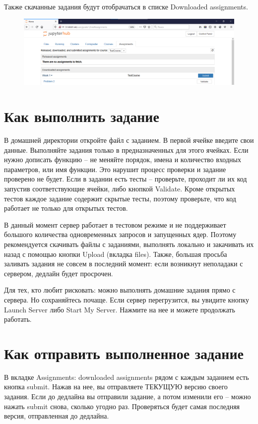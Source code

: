 \documentclass[a4paper,12pt]{article}
\begin{document}
Также скачанные задания будут отобрачаться в списке Downloaded assignments.

\begin{figure}[h]
\includegraphics[width=\textwidth]{fetched}
\end{figure}

\section{Как выполнить задание}
В домашней директории откройте файл с заданием. В первой ячейке введите свои данные. Выполняйте задания только в предназначенных для этого ячейках. Если нужно дописать функцию -- не меняйте порядок, имена и количество входных параметров, или имя функции. Это нарушит процесс проверки и задание проверено не будет. Если в задании есть тесты -- проверьте, проходит ли их код запустив соответствующие ячейки, либо кнопкой Validate. Кроме открытых тестов каждое задание содержит скрытые тесты, поэтому проверьте, что код работает не только для открытых тестов. 

В данный момент сервер работает в тестовом режиме и не поддерживает большого количества одновременных запросов и запущенных ядер. Поэтому рекомендуется скачивать файлы с заданиями, выполнять локально и закачивать их назад с помощью кнопки Upload (вкладка files). Также, большая просьба заливать задания не совсем в последний момент: если возникнут неполадаки с сервером, дедлайн будет просрочен. 

Для тех, кто любит рисковать: можно выполнять домашние задания прямо с сервера. Но сохраняйтесь почаще. Если сервер перегрузится, вы увидите кнопку Launch Server либо Start My Server. Нажмите на нее и можете продолжать работать. 

\section{Как отправить выполненное задание}

В вкладке Assignments: downloaded assignments рядом с каждым заданием есть кнопка submit. Нажав на нее, вы отправляете ТЕКУЩУЮ версию своего задания. Если до дедлайна вы отправили задание, а потом изменили его -- можно нажать submit снова, сколько угодно раз. Проверяться будет самая последняя версия, отправленная до дедлайна. 
\end{document}
